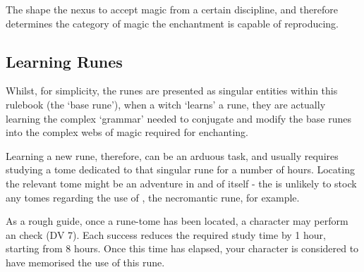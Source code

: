 {
	The  shape the nexus to accept magic from a certain discipline, and therefore determines the category of magic the enchantment is capable of reproducing.
}
{
	
	
	
	
	
	
	
	
	
	
	
	
	
} 



\subsection{Learning Runes}

Whilst, for simplicity, the runes are presented as singular entities within this rulebook (the `base rune'), when a witch `learns' a rune, they are actually learning the complex `grammar' needed to conjugate and modify the base runes into the complex webs of magic required for enchanting. 

Learning a new rune, therefore, can be an arduous task, and usually requires studying a tome dedicated to that singular rune for a number of hours. Locating the relevant tome might be an adventure in and of itself - the  is unlikely to stock any tomes regarding the use of \rune{\lues}, the necromantic rune, for example.

As a rough guide, once a rune-tome has been located, a character may perform an  check (DV 7). Each success reduces the required study time by 1 hour, starting from 8 hours. Once this time has elapsed, your character is considered to have memorised the use of this rune. 

